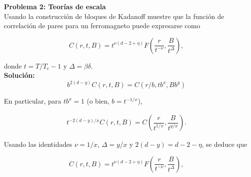 \documentclass[10pt]{article}
\begin{document}
\textbf{Problema 2: Teor\'ias de escala}\\

Usando la construcci\'on de bloques de Kadanoff muestre que la funci\'on de correlaci\'on de pares para un ferromagneto puede expresarse como 

\begin{equation}
C(r, t, B) = t^{\nu(d-2+\eta)} F\left( \dfrac{r}{t^{-\nu}}, \dfrac{B}{t^{\Delta}} \right),
\end{equation}

donde $t = T/T_c - 1$ y $\Delta = \beta \delta$.\\


\textbf{Soluci\'on:}\\

\begin{equation}
b^{2(d-y)}C(r, t, B) = C(r/b, t b^x, B b^y)
\end{equation}

En particular, para $t b^x = 1$ (o bien, $b = t^{-1/x}$), 

\begin{align*}
t^{-2(d-y)/x} C(r, t, B) = C\left( \dfrac{r}{t^{1/x}}, \dfrac{B}{t^{y/x}} \right).
\end{align*}

Usando las identidades $\nu = 1/x$, $\Delta = y/x$ y $2(d-y) = d - 2 - \eta$, se deduce que

\begin{equation}
C(r, t, B) = t^{\nu(d-2+\eta)} F\left( \dfrac{r}{t^{-\nu}}, \dfrac{B}{t^{\Delta}} \right),
\end{equation}
\end{document}
